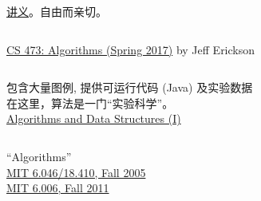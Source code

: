 \begin{frame}{}
  \begin{columns}
      \vspace{-0.30cm}
      {\centerline{\href{http://jeffe.cs.illinois.edu/teaching/algorithms/all-algorithms.pdf}{讲义}。自由而亲切。}}
  \end{columns}

  \vspace{0.30cm}
  \begin{center}
    \href{https://recordings.engineering.illinois.edu:8443/ess/portal/section/d6d800b7-eb5c-4420-8175-10becaf2d25d}{CS 473: Algorithms (Spring 2017)} by Jeff Erickson
  \end{center}
\end{frame}

\begin{frame}{}
  \begin{columns}
  \end{columns}

  \vspace{0.50cm}
  \begin{center}
    包含大量图例, 提供可运行代码 (Java) 及实验数据 \\[8pt]
    在这里，算法是一门``实验科学''。\\[10pt]

    \href{https://www.youtube.com/playlist?list=PLxc4gS-\_A5VDXUIOPkJkwQKYiT2T1t0I8}{Algorithms and Data Structures (I)}
  \end{center}
\end{frame}

\begin{frame}{}
  \begin{columns}
  \end{columns}

  \vspace{0.50cm}
  \begin{center}
    ``Algorithms''\\[4pt]
    \href{http://open.163.com/special/opencourse/algorithms.html}{MIT 6.046/18.410, Fall 2005}\\[3pt]
    \href{https://ocw.mit.edu/courses/electrical-engineering-and-computer-science/6-006-introduction-to-algorithms-fall-2011/lecture-videos/}{MIT 6.006, Fall 2011}\\[10pt]
  \end{center}
\end{frame}

